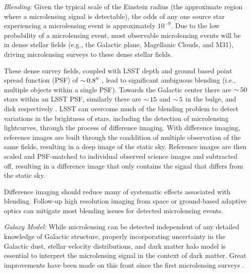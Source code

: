 \emph{Blending:} Given the typical scale  of the Einstein radius (the approximate region where a microlensing signal is detectable), the odds of any one source star experiencing a microlensing event is approximately $10^{-9}$. Due to the low probability of a microlensing event, most observable microlensing events will be in dense stellar fields (e.g., the Galactic plane, Magellanic Clouds, and M31), driving microlensing surveys to these dense stellar fields.

These dense survey fields, coupled with LSST depth and ground based point spread function (PSF) of $ {\sim}\, 0.8''$ \citep{0805.2366}, lead to significant ambiguous blending (i.e., multiple objects within a single PSF).
Towards the Galactic center there are $ {\sim}\, 50$ stars within an LSST PSF, similarly there are $ {\sim}\, 15$ and $ {\sim}\, 5$ in the bulge, and disk respectively \citep{1806.06372}.
LSST can overcome much of the blending problem to detect variations in the brightness of stars, including the detection of microlensing lightcurves, through the process of difference imaging.
With difference imaging, reference images are built through the coaddition of multiple observation of the same fields, resulting in a deep image of the static sky. Reference images are then scaled and PSF-matched to individual observed science images and subtracted off, resulting in a difference image that only contains the signal that differs from the static sky. 

Difference imaging should reduce many of systematic effects associated with blending. Follow-up high resolution imaging from space or ground-based adaptive optics can mitigate most blending issues for detected microlensing events.

\emph{Galaxy Model:} While microlensing can be detected independent of any detailed knowledge of Galactic structure, properly incorporating uncertainty in the Galactic dust, stellar velocity distributions, and dark matter halo model is essential to interpret the microlensing signal in the context of dark matter.
Great improvements have been made on this front since the first microlensing surveys \citep[e.g.,][]{2018MNRAS.479.2889C}.



